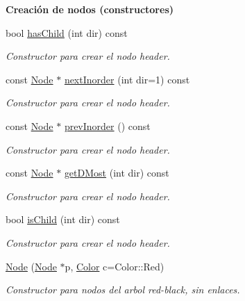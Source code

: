 \begin{Indent}{\bf Creación de nodos (constructores)}
\begin{DoxyCompactItemize}
bool \hyperlink{structaed2_1_1map_1_1Node_afe6fb054255e6b83c1a64783641f9f13_afe6fb054255e6b83c1a64783641f9f13}{has\-Child} (int dir) const 
\begin{DoxyCompactList}\small\item\em Constructor para crear el nodo header. \end{DoxyCompactList}\item 
const \hyperlink{structaed2_1_1map_1_1Node}{Node} $\ast$ \hyperlink{structaed2_1_1map_1_1Node_a10306c36697bb40f5824467ad1265e2c_a10306c36697bb40f5824467ad1265e2c}{next\-Inorder} (int dir=1) const 
\begin{DoxyCompactList}\small\item\em Constructor para crear el nodo header. \end{DoxyCompactList}\item 
const \hyperlink{structaed2_1_1map_1_1Node}{Node} $\ast$ \hyperlink{structaed2_1_1map_1_1Node_a9cdfce1b8a6d93f0e34ffcd4e0c6a1dc_a9cdfce1b8a6d93f0e34ffcd4e0c6a1dc}{prev\-Inorder} () const 
\begin{DoxyCompactList}\small\item\em Constructor para crear el nodo header. \end{DoxyCompactList}\item 
const \hyperlink{structaed2_1_1map_1_1Node}{Node} $\ast$ \hyperlink{structaed2_1_1map_1_1Node_aa6701efb52999be16d2ce9b50e147f36_aa6701efb52999be16d2ce9b50e147f36}{get\-D\-Most} (int dir) const 
\begin{DoxyCompactList}\small\item\em Constructor para crear el nodo header. \end{DoxyCompactList}\item 
bool \hyperlink{structaed2_1_1map_1_1Node_a78b4db7d625567a180aa2d3ee5f7efec_a78b4db7d625567a180aa2d3ee5f7efec}{is\-Child} (int dir) const 
\begin{DoxyCompactList}\small\item\em Constructor para crear el nodo header. \end{DoxyCompactList}\item 
\hyperlink{structaed2_1_1map_1_1Node_a62b5a42e88e219d53af8237a9ebedb6e_a62b5a42e88e219d53af8237a9ebedb6e}{Node} (\hyperlink{structaed2_1_1map_1_1Node}{Node} $\ast$p, \hyperlink{classaed2_1_1map_a6d62a415a4b9d320b30cada4ebcf9f5b_a6d62a415a4b9d320b30cada4ebcf9f5b}{Color} c=Color\-::\-Red)
\begin{DoxyCompactList}\small\item\em Constructor para nodos del arbol red-\/black, sin enlaces. \end{DoxyCompactList}\end{DoxyCompactItemize}
\end{Indent}

